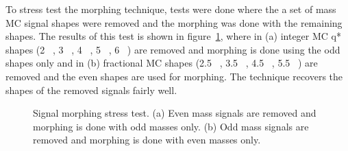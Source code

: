 To stress test the morphing technique, tests were done where the a set of mass MC signal shapes were removed and the morphing was done with the remaining shapes. The results of this test is shown in figure~\ref{fig:morphingTest}, where in (a) integer MC q* shapes (2 \TeV\ , 3 \TeV\ , 4 \TeV\ , 5 \TeV\ , 6 \TeV\ ) are removed and morphing is done using the odd shapes only and in (b) fractional MC shapes (2.5 \TeV\ , 3.5 \TeV\ , 4.5 \TeV\ , 5.5 \TeV\ ) are removed and the even shapes are used for morphing. The technique recovers the shapes of the removed signals fairly well.  

\begin{figure}[!htb]
	\centering
	\caption{
		Signal morphing stress test. (a) Even mass signals are removed and morphing is done with odd masses only. (b) Odd mass signals are removed and morphing is done with even masses only. 
		\label{fig:morphingTest}}
\end{figure}  



